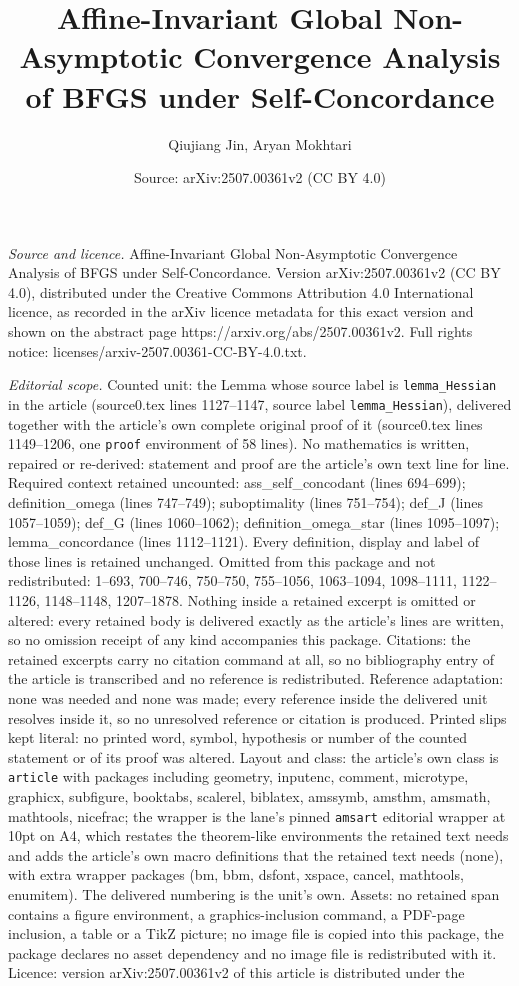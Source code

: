 \documentclass[10pt,a4paper]{amsart}
\title[Affine-Invariant Global Non-Asymptotic Convergence Analysis ]{Affine-Invariant Global Non-Asymptotic Convergence Analysis of BFGS under Self-Concordance}
\author{Qiujiang Jin, Aryan Mokhtari}
\date{Source: arXiv:2507.00361v2 (CC BY 4.0)}
\begin{document}
\maketitle

\noindent\emph{Source and licence.} Affine-Invariant Global Non-Asymptotic Convergence Analysis of BFGS under Self-Concordance. Version arXiv:2507.00361v2 (CC BY 4.0), distributed under the Creative Commons Attribution 4.0 International licence, as recorded in the arXiv licence metadata for this exact version and shown on the abstract page https://arxiv.org/abs/2507.00361v2. Full rights notice: licenses/arxiv-2507.00361-CC-BY-4.0.txt.\par\smallskip

\noindent\textit{Editorial scope.} Counted unit: the Lemma whose source label is \texttt{lemma\_Hessian} in the article (source0.tex lines 1127--1147, source label \texttt{lemma\_Hessian}), delivered together with the article's own complete original proof of it (source0.tex lines 1149--1206, one \texttt{proof} environment of 58 lines). No mathematics is written, repaired or re-derived: statement and proof are the article's own text line for line. Required context retained uncounted: ass\_self\_concodant (lines 694--699); definition\_omega (lines 747--749); suboptimality (lines 751--754); def\_J (lines 1057--1059); def\_G (lines 1060--1062); definition\_omega\_star (lines 1095--1097); lemma\_concordance (lines 1112--1121). Every definition, display and label of those lines is retained unchanged. Omitted from this package and not redistributed: 1--693, 700--746, 750--750, 755--1056, 1063--1094, 1098--1111, 1122--1126, 1148--1148, 1207--1878. Nothing inside a retained excerpt is omitted or altered: every retained body is delivered exactly as the article's lines are written, so no omission receipt of any kind accompanies this package. Citations: the retained excerpts carry no citation command at all, so no bibliography entry of the article is transcribed and no reference is redistributed. Reference adaptation: none was needed and none was made; every reference inside the delivered unit resolves inside it, so no unresolved reference or citation is produced. Printed slips kept literal: no printed word, symbol, hypothesis or number of the counted statement or of its proof was altered. Layout and class: the article's own class is \texttt{article} with packages including geometry, inputenc, comment, microtype, graphicx, subfigure, booktabs, scalerel, biblatex, amssymb, amsthm, amsmath, mathtools, nicefrac; the wrapper is the lane's pinned \texttt{amsart} editorial wrapper at 10pt on A4, which restates the theorem-like environments the retained text needs and adds the article's own macro definitions that the retained text needs (none), with extra wrapper packages (bm, bbm, dsfont, xspace, cancel, mathtools, enumitem). The delivered numbering is the unit's own. Assets: no retained span contains a figure environment, a graphics-inclusion command, a PDF-page inclusion, a table or a TikZ picture; no image file is copied into this package, the package declares no asset dependency and no image file is redistributed with it. Licence: version arXiv:2507.00361v2 of this article is distributed under the 
\end{document}
